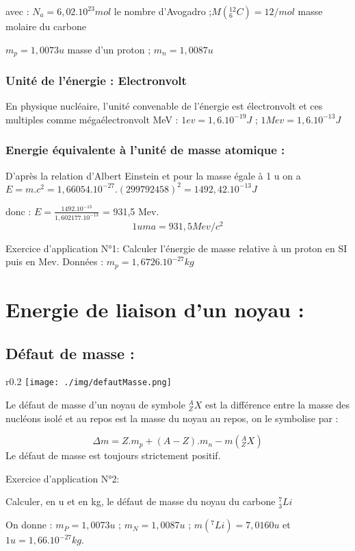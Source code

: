 \documentclass[12pt]{article}
\begin{document}
avec : $N_a = 6,02.10^{23} mol$ le nombre d'Avogadro ;$M(_6^{12}C) = 12/mol$ masse molaire du carbone

$m_p = 1,0073u$ masse d'un proton ; $m_n = 1,0087 u$

\subsubsection{Unité de l’énergie : Electronvolt}
En physique nucléaire, l'unité convenable de l'énergie est électronvolt et ces
multiples comme mégaélectronvolt MeV : $1ev = 1,6.10^{-19}J$ ; $1Mev = 1,6.10^{-13}J$
\subsubsection{ Energie équivalente à l'unité de masse atomique : }
D'après la relation d'Albert Einstein et pour la masse égale à 1 u on a
$E = m.c^2 = 1,66054.10^{-27}.(299792458)^2 = 1492,42.10^{-13}J$

donc : $E = \frac{1492.10^{-13}}{1,602177.10^{-13}}$ = 931,5 Mev.
$$1uma = 931,5 Mev/c^2$$

\begin{tcolorbox}
	Exercice d’application N°1: Calculer l’énergie de masse relative à un proton en SI puis en Mev. Données : $m_p = 1,6726.10^{-27} kg$
\end{tcolorbox}

\section{Energie de liaison d'un noyau : }
\subsection{Défaut de masse : }

\begin{wrapfigure}[1]{r}{0.2\textwidth}
	\vspace{-0.9cm}
	\texttt{[image: ./img/defautMasse.png]}
\end{wrapfigure}


Le défaut de masse d'un noyau de
symbole $_Z^AX$ est la différence entre la masse des nucléons isolé et au repos est la
masse du noyau au repos, on le symbolise
par :

$$\Delta{m} = Z.m_p + (A-Z).m_n - m(_Z^AX)$$
Le défaut de masse est toujours strictement positif.
\begin{tcolorbox}
	Exercice d’application N°2:

	Calculer, en u et en kg, le défaut de masse du noyau du carbone $^7_3Li$

	On donne : $m_P = 1,0073 u$ ; $m_N = 1,0087 u$ ; $m( ^7Li) = 7,0160 u$ et $1u=1,66.10^{-27} kg$.
\end{tcolorbox}
\end{document}
